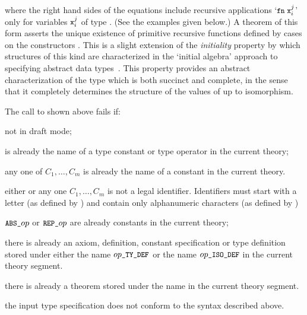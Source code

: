 \noindent where the right hand sides of the equations include recursive
applications `$\ml{fn}\;\ml{x}_i^j$' only for variables  $\ml{x}_i^j$ of type
.  (See the examples given below.) A theorem of this form asserts the
unique existence of primitive recursive functions defined by cases on the
constructors .  This is a slight
extension of the {\it initiality\/} property by which
structures of this kind are characterized in the `initial algebra' approach to
specifying abstract data types~\cite{goguen}.  This property provides an
abstract characterization of the type  which is both succinct and
complete, in the sense that it completely determines the structure of the
values of  up to isomorphism.

The call to  shown above fails if:

\begin{myenumerate}

\item not in draft mode;

\item {} is already the name of a type constant or type operator in the
current theory;

\item any one of $C_1,\dots,C_{m}$ is already the name
of a constant in the current theory.

\item either  or any one $C_{1},\dots,C_{m}$ is not a
legal identifier.  Identifiers must start with a letter (as defined by
) and contain only alphanumeric characters (as defined by
)

\item $\ml{ABS\_}\ty{op}$
 or $\ml{REP\_}\ty{op}$
 are already constants in the
current theory;

\item there is already an axiom, definition, constant specification or type
definition stored under either the name
$\ty{op}\ml{\_TY\_DEF}$ or the name
$\ty{op}\ml{\_ISO\_DEF}$ in the current
theory segment.

\item there is already a theorem stored under the name  in the
current theory segment.

\item the input type specification does not conform to the syntax described
above.

\end{myenumerate}

